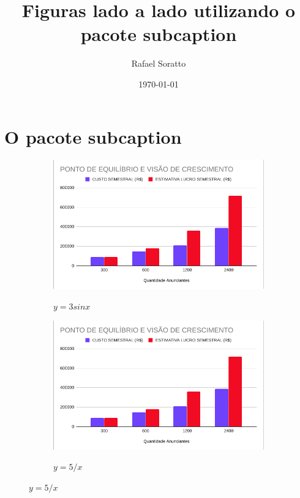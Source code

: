 \documentclass{article}
\title{Figuras lado a lado utilizando o pacote subcaption}
\author{Rafael Soratto}
\date{\today}
\begin{document}
\maketitle

\section{O pacote subcaption}
\begin{figure}[H] 
\caption{Two simple graphs}
\label{fig:three graphs}
     \centering
     \begin{subfigure}[H]{0.4\textwidth}
         \centering 
         \caption{$y=3sinx$}
         \includegraphics[width=\textwidth]{PONTOEQ}
         \label{fig:three sin x}
     \end{subfigure}
     \hfill
     \begin{subfigure}[H]{0.4\textwidth}
         \centering 
              \caption{$y=5/x$}
         \includegraphics[width=\textwidth]{PONTOEQ.png}
         \label{fig:five over x}
     \end{subfigure} 
\end{figure}
\end{document}
